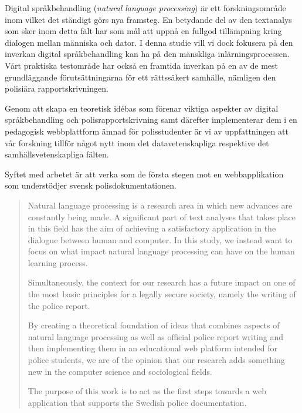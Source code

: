 \documentclass[swedish]{maucsthesis}
\begin{document}

\author{Kalle Lindqvist \and Henrik Svensson}

\subject{datavetenskap}


\maketitle %

\begin{sammanfattning}
  Digital språkbehandling (\textit{natural language processing}) är ett forskningsområde inom vilket det ständigt görs nya framsteg. En
  betydande del av den textanalys som sker inom detta fält har som mål att
  uppnå en fullgod tillämpning kring dialogen mellan människa och dator. I denna
  studie vill vi dock fokusera på den inverkan digital språkbehandling kan ha på den
  mänskliga inlärningsprocessen. Vårt praktiska testområde har också en
  framtida inverkan på en av de mest grundläggande förutsättningarna för ett
  rättssäkert samhälle, nämligen den polisiära rapportskrivningen.

  Genom att skapa en teoretisk idébas som förenar viktiga aspekter av
  digital språkbehandling och polisrapportskrivning samt därefter
  implementerar dem i en pedagogisk webbplattform ämnad för polisstudenter är vi
  av uppfattningen att vår forskning tillför något nytt inom det
  datavetenskapliga respektive det samhällsvetenskapliga fälten.

  Syftet med arbetet är att verka som de första stegen mot en webbapplikation
  som understödjer svensk polisdokumentationen.
\end{sammanfattning}

\begin{abstract}
  Natural language processing is a research area in which new advances are
  constantly being made. A significant part of text analyses that takes place in
  this field has the aim of achieving a satisfactory application in the dialogue
  between human and computer. In this study, we instead want to focus on what
  impact natural language processing can have on the human learning process.

  Simultaneously, the context for our research has a future impact on one of
  the most basic principles for a legally secure society, namely the writing of
  the police report.

  By creating a theoretical foundation of ideas that combines aspects of natural
  language processing as well as official police report writing and then
  implementing them in an educational web platform intended for police students,
  we are of the opinion that our research adds something new in the computer
  science and sociological fields.

  The purpose of this work is to act as the first steps towards a web
  application that supports the Swedish police documentation.
\end{abstract}
\end{document}
